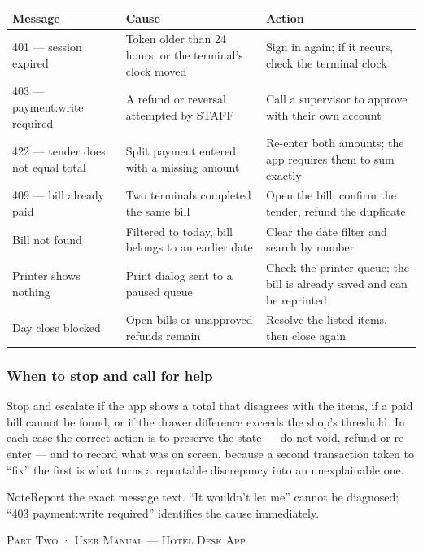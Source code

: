 \documentclass[11pt,a4paper,oneside]{book}
\begin{document}
\begin{center}\small
\begin{tabularx}{\linewidth}{|X|X|X|}
\hline
\rowcolor{lightgrey}
\textbf{Message} & \textbf{Cause} & \textbf{Action} \\ \hline
401 — session expired & Token older than 24 hours, or the terminal's clock moved & Sign in again; if it recurs, check the terminal clock \\ \hline
403 — payment:write required & A refund or reversal attempted by STAFF & Call a supervisor to approve with their own account \\ \hline
422 — tender does not equal total & Split payment entered with a missing amount & Re-enter both amounts; the app requires them to sum exactly \\ \hline
409 — bill already paid & Two terminals completed the same bill & Open the bill, confirm the tender, refund the duplicate \\ \hline
Bill not found & Filtered to today, bill belongs to an earlier date & Clear the date filter and search by number \\ \hline
Printer shows nothing & Print dialog sent to a paused queue & Check the printer queue; the bill is already saved and can be reprinted \\ \hline
Day close blocked & Open bills or unapproved refunds remain & Resolve the listed items, then close again \\ \hline
\end{tabularx}
\end{center}
\subsubsection*{When to stop and call for help}
Stop and escalate if the app shows a total that disagrees with the items, if a paid bill cannot be found, or if the drawer difference exceeds the shop's threshold. In each case the correct action is to preserve the state — do not void, refund or re-enter — and to record what was on screen, because a second transaction taken to “fix” the first is what turns a reportable discrepancy into an unexplainable one.

\begin{notebox}NoteReport the exact message text. “It wouldn't let me” cannot be diagnosed; “403 payment:write required” identifies the cause immediately.\end{notebox}
\textsc{\small\color{crimson}Part Two · User Manual — Hotel Desk App}\par\medskip
\end{document}
